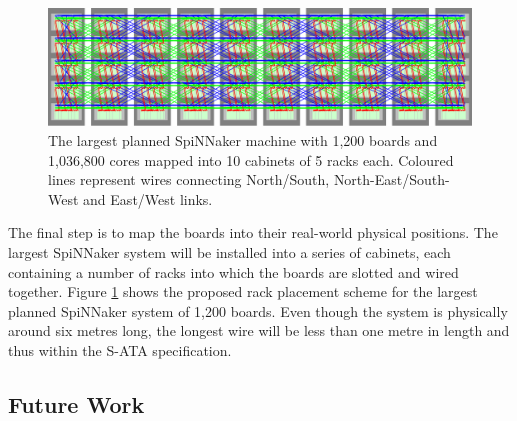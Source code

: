 			\label{sec:mapping-spinnaker-to-cabinets}
			
			\begin{figure}
				\center
				\includegraphics[width=\textwidth]{figures/spinnaker106}
				\caption[SpiNNaker machine mapped into cabinets and racks.]{The largest
				planned SpiNNaker machine with 1,200 boards and 1,036,800 cores mapped
				into 10 cabinets of 5 racks each.  Coloured lines represent wires
				connecting {\color{red}North/South},
				{\color{green}North-East/South-West} and {\color{blue}East/West} links.}
				\label{fig:spinnaker106}
			\end{figure}
			
			The final step is to map the boards into their real-world physical
			positions. The largest SpiNNaker system will be installed into a series of
			cabinets, each containing a number of racks into which the boards are
			slotted and wired together. Figure \ref{fig:spinnaker106} shows the
			proposed rack placement scheme for the largest planned SpiNNaker system of
			1,200 boards. Even though the system is physically around six metres long,
			the longest wire will be less than one metre in length and thus within the
			S-ATA specification.
		
		\subsection{Future Work}
			
			
